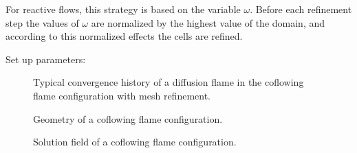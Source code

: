 For reactive flows, this strategy is based on the variable $\omega$.
Before each refinement step the values of $\omega$ are normalized by the highest value of the domain, and according to this normalized effects the cells are refined. %

Set up parameters: 
\begin{figure}[t!]
	\centering
	\caption{Typical convergence history of a diffusion flame in the coflowing flame configuration with mesh refinement.}
	\label{fig:CoFlow_ConvergenceStory}
\end{figure}
\begin{figure}[t]
	\centering
	\def\svgwidth{0.43\textwidth}
	\qquad\quad
	\def\svgwidth{0.35\textwidth}
	\caption{Geometry of a coflowing flame configuration.} \label{fig:CoFlowGeometry}
\end{figure}


\begin{figure}[t]
	\centering
	\pgfplotsset{width=0.6\textwidth, compat=1.3}
	\par\bigskip
	\caption{Solution field of a coflowing flame configuration.} \label{fig:CoFlowFlameFig}
\end{figure}

\FloatBarrier